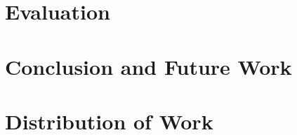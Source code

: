 \documentclass[conference]{IEEEtran}
\begin{document}
  \section{Evaluation}
  \label{Evaluation}
    

  \section{Conclusion and Future Work}
  \label{Conclusion}
    

  \section{Distribution of Work}
  \label{Distribution}
    

  
  
\end{document}

